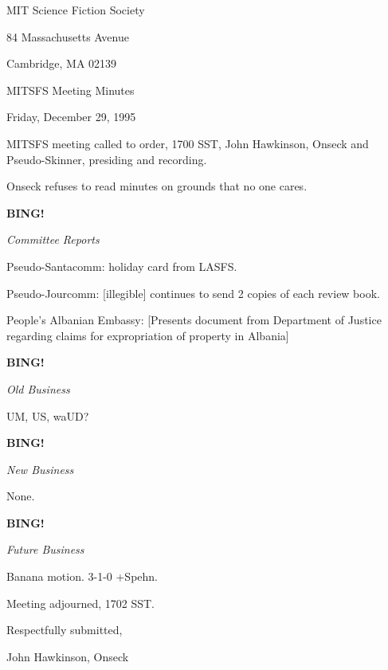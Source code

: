 \documentclass[12pt]{article}
\newcommand{\bing}{{\bf BING!} }
\newcommand{\goto}[1]{\bing \vskip 12pt \centerline{{\em{#1}}}}
\begin{document}
\begin{center}

MIT Science Fiction Society 

84 Massachusetts Avenue

Cambridge, MA 02139

\vspace{12pt}

MITSFS Meeting Minutes 

Friday, December 29, 1995

\end{center}
 
\vspace{18pt}

\setlength{\parskip}{6pt}

\noindent
MITSFS meeting called to order, 1700 SST,
John Hawkinson, Onseck and Pseudo-Skinner, presiding and recording.

Onseck refuses to read minutes on grounds that no one cares.

\goto{Committee Reports}

Pseudo-Santacomm: holiday card from LASFS.

Pseudo-Jourcomm: [illegible] continues to send 2 copies of each review book.

People's Albanian Embassy: [Presents document from Department of Justice regarding claims for expropriation of property in Albania]

\goto{Old Business}

UM, US, waUD?

\goto{New Business}

None.

\goto{Future Business}

Banana motion. 3-1-0 +Spehn.

\vspace{12pt}

\noindent
Meeting adjourned, 1702 SST.

\vspace{18pt}

\centerline{Respectfully submitted,}
\centerline{John Hawkinson, Onseck}
\end{document}

